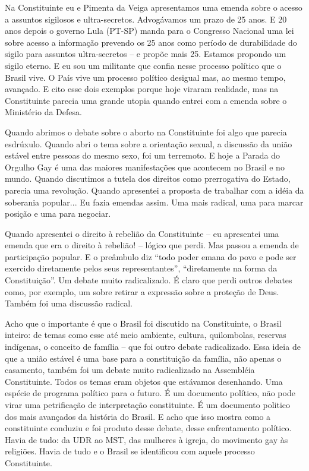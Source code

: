 Na Constituinte eu e Pimenta da Veiga apresentamos uma emenda sobre o
acesso a assuntos sigilosos e ultra-secretos. Advogávamos um prazo de 25
anos. E 20 anos depois o governo Lula (PT-SP) manda para o Congresso
Nacional uma lei sobre acesso a informação prevendo os 25 anos como
período de durabilidade do sigilo para assuntos ultra-secretos -- e
propõe mais 25. Estamos propondo um sigilo eterno. E eu sou um militante
que confia nesse processo político que o Brasil vive. O País vive um
processo político desigual mas, ao mesmo tempo, avançado. E cito esse
dois exemplos porque hoje viraram realidade, mas na Constituinte parecia
uma grande utopia quando entrei com a emenda sobre o Ministério da
Defesa.

Quando abrimos o debate sobre o aborto na Constituinte foi algo que
parecia esdrúxulo. Quando abri o tema sobre a orientação sexual, a
discussão da união estável entre pessoas do mesmo sexo, foi um
terremoto. E hoje a Parada do Orgulho Gay é uma das maiores
manifestações que acontecem no Brasil e no mundo. Quando discutimos a
tutela dos direitos como prerrogativa do Estado, parecia uma revolução.
Quando apresentei a proposta de trabalhar com a idéia da soberania
popular... Eu fazia emendas assim. Uma mais radical, uma para marcar
posição e uma para negociar.

Quando apresentei o direito à rebelião da Constituinte -- eu apresentei
uma emenda que era o direito à rebelião! -- lógico que perdi. Mas passou
a emenda de participação popular. E o preâmbulo diz ``todo poder emana
do povo e pode ser exercido diretamente pelos seus representantes'',
``diretamente na forma da Constituição''. Um debate muito radicalizado.
É claro que perdi outros debates como, por exemplo, um sobre retirar a
expressão sobre a proteção de Deus. Também foi uma discussão radical.

Acho que o importante é que o Brasil foi discutido na Constituinte, o
Brasil inteiro: de temas como esse até meio ambiente, cultura,
quilombolas, reservas indígenas, o conceito de família -- que foi outro
debate radicalizado. Essa ideia de que a união estável é uma base para a
constituição da família, não apenas o casamento, também foi um debate
muito radicalizado na Assembléia Constituinte. Todos os temas eram
objetos que estávamos desenhando. Uma espécie de programa político para
o futuro. É um documento político, não pode virar uma petrificação de
interpretação constituinte. É um documento politico dos mais avançados
da história do Brasil. E acho que isso mostra como a constituinte
conduziu e foi produto desse debate, desse enfrentamento político. Havia
de tudo: da UDR ao MST, das mulheres à igreja, do movimento gay às
religiões. Havia de tudo e o Brasil se identificou com aquele processo
Constituinte.

